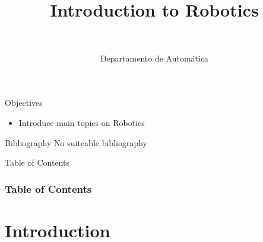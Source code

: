 \documentclass[10pt,compress]{beamer} %
\title[Introduction to Robotics]{Introduction to Robotics}
\author{\asignatura\\\carrera}
\institute{}
\date{Departamento de Automática}
\begin{document}
{\titlepageBlue
    \begin{frame}
        \titlepage
    \end{frame}
}

\begin{frame}[plain]{}
   \begin{block}{Objectives}
       \begin{itemize}
        \item Introduce main topics on Robotics
       \end{itemize}
   \end{block}

   \begin{block}{Bibliography}
       No suiteable bibliography
   \end{block}
\end{frame}

{
\begin{frame}[shrink]{Table of Contents}
 \frametitle{Table of Contents}
 \tableofcontents
\end{frame}
}

\section{Introduction}
\end{document}
